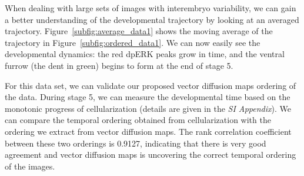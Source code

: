 \documentclass{pnastwo}
\begin{document}
\begin{article}
When dealing with large sets of images with interembryo variability, we can gain a better understanding of the developmental trajectory by looking at an averaged trajectory.
%
Figure~\ref{subfig:average_data1} shows the moving average of the trajectory in Figure~\ref{subfig:ordered_data1}. 
%
We can now easily see the developmental dynamics: the red dpERK peaks grow in time, and the ventral furrow (the dent in green) begins to form at the end of stage 5. 

For this data set, we can validate our proposed vector diffusion maps ordering of the data.
%
During stage 5, we can measure the developmental time based on the monotonic progress of cellularization (details are given in the {\it SI Appendix}).
%
We can compare the temporal ordering obtained from cellularization with the ordering we extract from vector diffusion maps. 
%
The rank correlation coefficient between these two orderings is 0.9127, indicating that there is very good agreement and vector diffusion maps is uncovering the correct temporal ordering of the images. 


\end{article}
\end{document}
